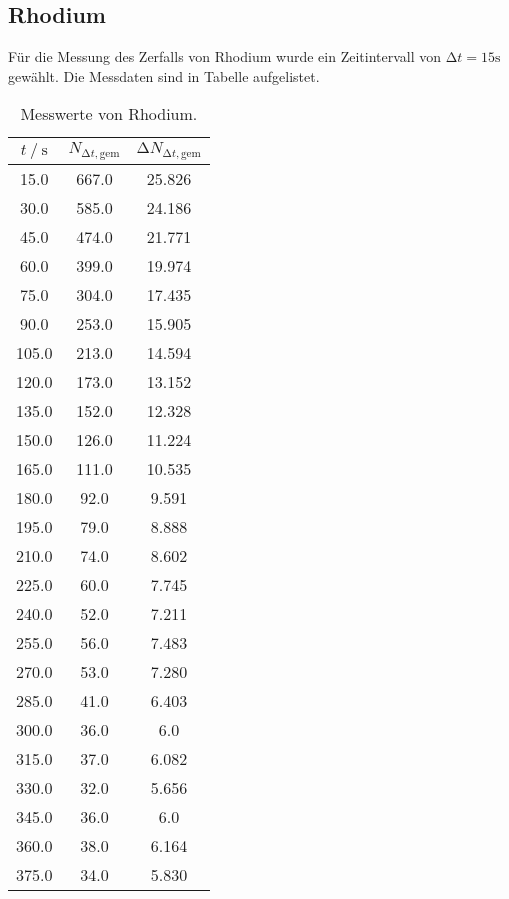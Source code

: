 \subsection{Rhodium}

Für die Messung des Zerfalls von Rhodium wurde ein Zeitintervall von 
$\increment t = 15 \si{\s}$ gewählt. Die Messdaten sind in Tabelle %
aufgelistet.

\begin{table}
 \centering
 \caption{Messwerte von Rhodium.}
 \label{tab:rhowerte}
 \begin{tabular}{c c c}
  \toprule
  {$t \mathbin{/} \si{\s}$} & {$N_{\increment t, \text{gem}}$} & {$\increment N_{\increment t, \text{gem}}$}\\
  \midrule
  15.0    & 667.0  & 25.826 \\
  30.0    & 585.0  & 24.186  \\  
  45.0    & 474.0  & 21.771  \\  
  60.0    & 399.0  & 19.974  \\  
  75.0    & 304.0  & 17.435  \\  
  90.0    & 253.0  & 15.905  \\  
  105.0   & 213.0  & 14.594  \\  
  120.0   & 173.0  & 13.152  \\  
  135.0   & 152.0  & 12.328  \\  
  150.0   & 126.0  & 11.224  \\  
  165.0   & 111.0  & 10.535  \\  
  180.0   & 92.0   & 9.591  \\  
  195.0   & 79.0   & 8.888  \\  
  210.0   & 74.0   & 8.602  \\  
  225.0   & 60.0   & 7.745  \\  
  240.0   & 52.0   & 7.211  \\  
  255.0   & 56.0   & 7.483  \\  
  270.0   & 53.0   & 7.280  \\  
  285.0   & 41.0   & 6.403  \\  
  300.0   & 36.0   & 6.0     \\  
  315.0   & 37.0   & 6.082  \\  
  330.0   & 32.0   & 5.656  \\  
  345.0   & 36.0   & 6.0    \\  
  360.0   & 38.0   & 6.164  \\  
  375.0   & 34.0   & 5.830  \\  

\end{tabular}
\end{table}
